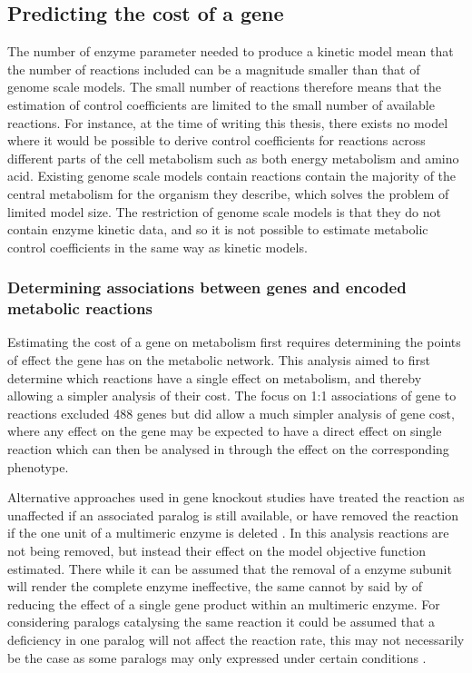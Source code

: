 \subsection{Predicting the cost of a gene}

The number of enzyme parameter needed to produce a kinetic model mean that the number of reactions included can be a magnitude smaller than that of genome scale models. The small number of reactions therefore means that the estimation of  control coefficients are limited to the small number of available reactions. For instance, at the time of writing this thesis, there exists no model where it would be possible to derive control coefficients for reactions across different parts of the cell metabolism such as both energy metabolism and amino acid. Existing genome scale models contain reactions contain the majority of the central metabolism for the organism they describe, which solves the problem of limited model size. The restriction of genome scale models is that they do not contain enzyme kinetic data, and so it is not possible to estimate metabolic control coefficients in the same way as kinetic models.

\subsubsection{Determining associations between genes and encoded metabolic reactions}

Estimating the cost of a gene on metabolism first requires determining the points of effect the gene has on the metabolic network. This analysis aimed to first determine which reactions have a single effect on metabolism, and thereby allowing a simpler analysis of their cost. The focus on 1:1 associations of gene to reactions excluded 488 genes but did allow a much simpler analysis of gene cost, where any effect on the gene may be expected to have a direct effect on single reaction which can then be analysed in through the effect on the corresponding phenotype.

Alternative approaches used in gene knockout studies have treated the reaction as unaffected if an associated paralog is still available, or have removed the reaction if the one unit of a multimeric enzyme is deleted \cite{pal2006}. In this analysis reactions are not being removed, but instead their effect on the model objective function estimated. There while it can be assumed that the removal of a enzyme subunit will render the complete enzyme ineffective, the same cannot by said by of reducing the effect of a single gene product within an multimeric enzyme. For considering paralogs catalysing the same reaction it could be assumed that a deficiency in one paralog will not affect the reaction rate, this may not necessarily be the case as some paralogs may only expressed under certain conditions \cite{carlson2007,perez2008}.


